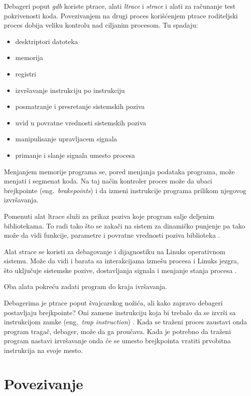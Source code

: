 \documentclass[a4paper]{article}
\begin{document}
Debageri poput \emph{gdb} koriste ptrace, alati \emph{ltrace} i \emph{strace} i alati za računanje test pokrivenosti koda.
Povezivanjem na drugi proces korišćenjem ptrace roditeljski proces dobija veliku kontrolu nad ciljanim procesom.
Tu spadaju:
\begin{itemize}
    \item desktriptori datoteka
    \item memorija
    \item registri
    \item izvršavanje instrukciju po instrukciju
    \item posmatranje i presretanje sistemskih poziva
    \item uvid u povratne vrednosti sistemskih poziva
    \item manipulisanje upravljacem signala
    \item primanje i slanje signala umesto procesa
\end{itemize}

Menjanjem memorije programa se, pored menjanja podataka programa, može menjati i segmenat koda. 
Na taj način kontroler proces može da ubaci brejkpointe  (eng.~{\em brakepoints}) i da izmeni instrukcije 
programa prilikom njegovog izvršavanja.

Pomenuti alat ltrace služi za prikaz poziva koje program salje deljenim bibliotekama. To radi tako što se zakači na sistem
za dinamičko punjenje pa tako može da vidi funkcije, parametre i povratne vrednosti poziva biblioteka \cite{lman}.

Alat strace se koristi za debagovanje i dijagnostiku na Linuks operativnom sistemu. 
Može da vidi i barata sa interakcijama izmešu procesa i Linuks jezgra, što uključuje sistemske pozive, dostavljanja signala 
i menjanje stanja procesa \cite{sman}.

Oba alata pokreću zadati program do kraja ivršavanja.

Debagerima je ptrace poput švajcarskog nožića, ali kako zapravo debageri postavljaju brejkpointe? 
Oni zamene instrukciju koja bi trebalo da se izvrši sa instrukcijom zamke 
(eng.~{\em trap instruction}) \cite{journal}. Kada se traženi proces zaustavi onda program tragač, debager, može da
ga proučava. Kada je potrebno da traženi program nastavi izvršavanje onda će se umesto brejkpointa vratiti 
prvobitna instrukcija na svoje mesto.

\section{Povezivanje}
\end{document}

